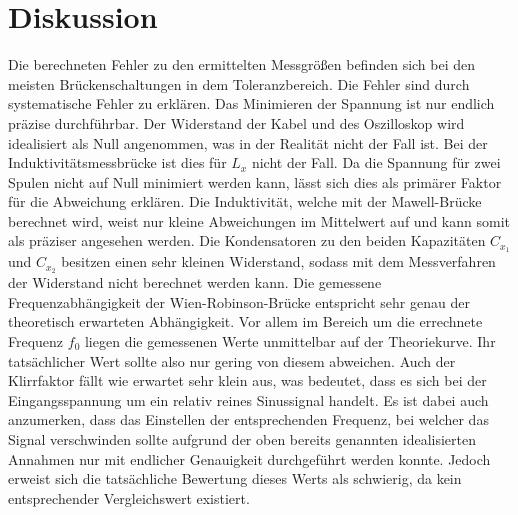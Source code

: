 \section{Diskussion}
\label{sec:Diskussion}
Die berechneten Fehler zu den ermittelten Messgrößen befinden sich bei den meisten
Brückenschaltungen in dem Toleranzbereich. Die Fehler sind durch systematische Fehler zu erklären.
Das Minimieren der Spannung ist nur endlich präzise durchführbar. Der Widerstand der Kabel und des Oszilloskop wird
idealisiert als Null angenommen, was in der Realität nicht der Fall ist.
Bei der Induktivitätsmessbrücke ist dies
für $L_x$ nicht der Fall. Da die Spannung für zwei Spulen nicht auf Null minimiert werden kann, lässt sich dies
als primärer Faktor für die Abweichung erklären. Die Induktivität, welche mit der Mawell-Brücke berechnet wird, weist
nur kleine Abweichungen im Mittelwert auf und kann somit als präziser angesehen werden. Die Kondensatoren
zu den beiden Kapazitäten $C_{x_1}$ und $C_{x_2}$ besitzen einen sehr kleinen Widerstand, sodass mit dem
Messverfahren der Widerstand nicht berechnet werden kann.
Die gemessene Frequenzabhängigkeit der Wien-Robinson-Brücke entspricht sehr genau der theoretisch erwarteten Abhängigkeit. Vor allem
im Bereich um die errechnete Frequenz $f_0$ liegen die gemessenen Werte unmittelbar auf der Theoriekurve. Ihr tatsächlicher Wert sollte
also nur gering von diesem abweichen.
Auch der Klirrfaktor fällt wie erwartet sehr klein aus, was bedeutet, dass es sich bei der Eingangsspannung um ein relativ reines
Sinussignal handelt. Es ist dabei auch anzumerken, dass das Einstellen der entsprechenden Frequenz, bei welcher das Signal
verschwinden sollte aufgrund der oben bereits genannten idealisierten Annahmen nur mit endlicher Genauigkeit durchgeführt werden konnte.
Jedoch erweist sich die tatsächliche Bewertung dieses Werts als schwierig, da kein entsprechender Vergleichswert existiert.
